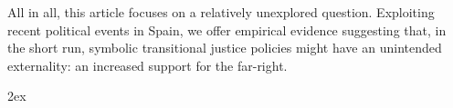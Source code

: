 \documentclass[12pt, notitlepage]{article}
\begin{document}
All in all, this article focuses on a relatively unexplored question. Exploiting recent political events in Spain, we offer empirical evidence suggesting that, in the short run, symbolic transitional justice policies might have an unintended externality: an increased support for the far-right.

\newpage
\begingroup
\parindent 0pt
\parskip 2ex
\def\enotesize{\normalsize}
\theendnotes
\endgroup

\clearpage



% 
\end{document}
